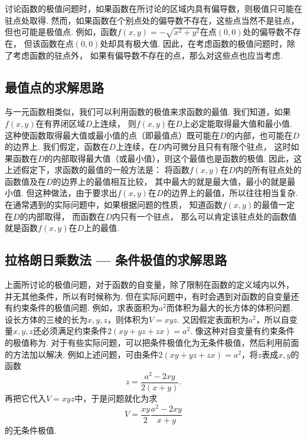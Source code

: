 讨论函数的极值问题时，如果函数在所讨论的区域内具有偏导数，则极值只可能在驻点处取得.
然而，如果函数在个别点处的偏导数不存在，这些点当然不是驻点，但也可能是极值点.
例如，函数\(f(x,y) = -\sqrt{x^2+y^2}\)在点\((0,0)\)处的偏导数不存在，
但该函数在点\((0,0)\)处却具有极大值.
因此，在考虑函数的极值问题时，除了考虑函数的驻点外，
如果有偏导数不存在的点，那么对这些点也应当考虑.

\subsection{最值点的求解思路}
与一元函数相类似，我们可以利用函数的极值来求函数的最值.
我们知道，如果\(f(x,y)\)在有界闭区域\(D\)上连续，
则\(f(x,y)\)在\(D\)上必定能取得最大值和最小值.
这种使函数取得最大值或最小值的点（即最值点）既可能在\(D\)的内部，也可能在\(D\)的边界上.
我们假定，函数在\(D\)上连续，在\(D\)内可微分且只有有限个驻点，
这时如果函数在\(D\)的内部取得最大值（或最小值），则这个最值也是函数的极值.
因此，这上述假定下，求函数的最值的一般方法是：
将函数\(f(x,y)\)在\(D\)内的所有驻点处的函数值及在\(D\)的边界上的最值相互比较，
其中最大的就是最大值，最小的就是最小值.
但这种做法，由于要求出\(f(x,y)\)在\(D\)的边界上的最值，所以往往相当复杂.
在通常遇到的实际问题中，如果根据问题的性质，
知道函数\(f(x,y)\)的最值一定在\(D\)的内部取得，
而函数在\(D\)内只有一个驻点，
那么可以肯定该驻点处的函数值就是函数\(f(x,y)\)在\(D\)上的最值.

\subsection{拉格朗日乘数法 --- 条件极值的求解思路}\label{section:多元函数微分法.拉格朗日乘数法}
上面所讨论的极值问题，对于函数的自变量，除了限制在函数的定义域内以外，
并无其他条件，所以有时候称为.
但在实际问题中，有时会遇到对函数的自变量还有约束条件的极值问题.
例如，求表面积为\(a^2\)而体积为最大的长方体的体积问题.
设长方体的三棱的长为\(x,y,z\)，则体积为\(V = xyz\).
又因假定表面积为\(a^2\)，所以自变量\(x,y,z\)还必须满足约束条件\(2(xy+yz+zx)=a^2\).
像这种对自变量有约束条件的极值称为.
对于有些实际问题，可以把条件极值化为无条件极值，然后利用前面的方法加以解决.
例如上述问题，可由条件\(2(xy+yz+zx)=a^2\)，将\(z\)表成\(x,y\)的函数\begin{equation*}
	z = \frac{a^2-2xy}{2(x+y)}.
\end{equation*}
再把它代入\(V = xyz\)中，于是问题就化为求\begin{equation*}
	V = \frac{xy}{2} \frac{a^2-2xy}{x+y}
\end{equation*}的无条件极值.

